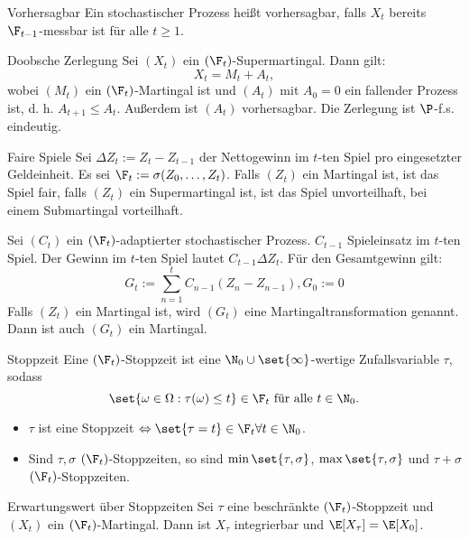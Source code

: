 \begin{karte}{Vorhersagbar}
Ein stochastischer Prozess heißt vorhersagbar, falls \(X_t\) 
bereits \(\F_{t-1}\)-messbar ist für alle \(t \geq 1\).
\end{karte}

\begin{karte}{Doobsche Zerlegung}
Sei \((X_t)\) ein \((\F_t)\)-Supermartingal. Dann gilt: 
\[ X_t = M_t + A_t, \]
wobei \((M_t)\) ein \((\F_t)\)-Martingal ist und \((A_t)\) mit \(A_0 = 0\) 
ein fallender Prozess ist, d. h. \(A_{t+1} \leq A_t\). Außerdem ist \((A_t)\) 
vorhersagbar. Die Zerlegung ist \(\P\)-f.s. eindeutig.
\end{karte}

\begin{karte}{Faire Spiele}
Sei \(\Delta Z_t := Z_t - Z_{t-1}\) der Nettogewinn im \(t\)-ten Spiel pro eingesetzter Geldeinheit. 
Es sei \(\F_t := \sigma(Z_0, \ldots, Z_t)\).
Falls \((Z_t)\) ein Martingal ist, ist das Spiel fair, falls \((Z_t)\) ein Supermartingal ist, 
ist das Spiel unvorteilhaft, bei einem Submartingal vorteilhaft.  

Sei \((C_t)\) ein \((\F_t)\)-adaptierter stochastischer Prozess. 
\(C_{t-1}\) Spieleinsatz im \(t\)-ten Spiel. Der Gewinn im \(t\)-ten Spiel lautet 
\(C_{t-1} \Delta Z_t\). 
Für den Gesamtgewinn gilt: 
\[ G_t := \sum_{n=1}^t C_{n-1} (Z_n - Z_{n-1}), G_0 := 0 \] 
Falls \((Z_t)\) ein Martingal ist, wird \((G_t)\) eine Martingaltransformation genannt. 
Dann ist auch \((G_t)\) ein Martingal.
\end{karte}

\begin{karte}{Stoppzeit}
Eine \((\F_t)\)-Stoppzeit ist eine \(\N_0 \cup \set{\infty}\)-wertige Zufallsvariable \(\tau\), sodass 
\[ \set{ \omega \in \Omega: \tau(\omega) \leq t } \in \F_t \text{ für alle } t\in\N_0. \]

\begin{itemize}
    \item \(\tau\) ist eine Stoppzeit \(\Leftrightarrow \set{\tau = t} \in \F_t \forall t\in \N_0\).
    \item Sind \(\tau, \sigma\) \((\F_t)\)-Stoppzeiten, so sind \(\min \set{\tau, \sigma}\), \(\max\set{\tau, \sigma}\) 
    und \(\tau + \sigma\) \((\F_t)\)-Stoppzeiten.
\end{itemize}
\end{karte}

\begin{karte}{Erwartungswert über Stoppzeiten}
Sei \(\tau\) eine beschränkte \((\F_t)\)-Stoppzeit und \((X_t)\) ein \((\F_t)\)-Martingal. 
Dann ist \(X_\tau\) integrierbar und \(\E[X_\tau] = \E[X_0]\).
\end{karte}

